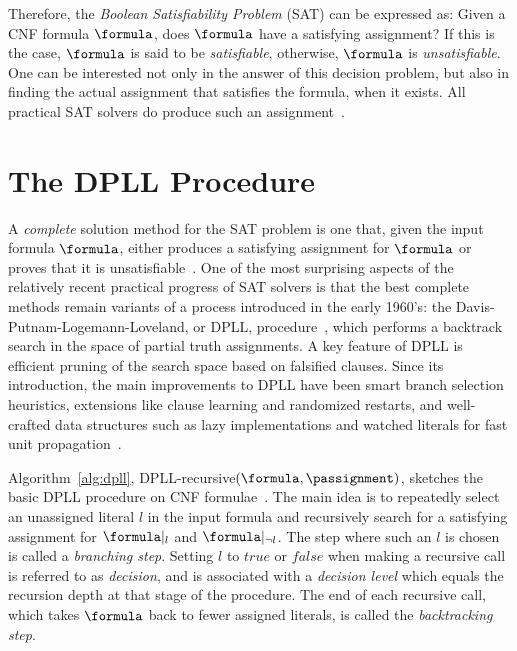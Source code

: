 Therefore, the \emph{Boolean Satisfiability Problem} (SAT) can be expressed as:
Given a CNF formula $\formula$, does $\formula$ have a satisfying assignment? If
this is the case, $\formula$ is said to be \emph{satisfiable}, otherwise,
$\formula$ is \emph{unsatisfiable}.  One can be interested not only in the
answer of this decision problem, but also in finding the actual assignment that
satisfies the formula, when it exists. All practical SAT solvers do produce such
an assignment~\cite{cormen}. 

\section{The DPLL Procedure}%
\label{sec:dpll}

A \emph{complete} solution method for the SAT problem is one that, given the
input formula $\formula$, either produces a satisfying assignment for $\formula$
or proves that it is unsatisfiable~\cite{satchapter}. One of the most surprising
aspects of the relatively recent practical progress of SAT solvers is that the
best complete methods remain variants of a process introduced in the early
1960’s: the Davis-Putnam-Logemann-Loveland, or DPLL,
procedure~\cite{DavisLongemannLoveland:1962}, which performs a backtrack search
in the space of partial truth assignments. A key feature of DPLL is efficient
pruning of the search space based on falsified clauses. Since its introduction,
the main improvements to DPLL have been smart branch selection heuristics,
extensions like clause learning and randomized restarts, and well-crafted data
structures such as lazy implementations and watched literals for fast unit
propagation~\cite{satchapter}.

Algorithm~\ref{alg:dpll}, DPLL-recursive$(\formula, \passignment)$, sketches the basic
DPLL procedure on CNF formulae~\cite{DavisLongemannLoveland:1962}. The main idea
is to repeatedly select an unassigned literal $l$ in the input formula and
recursively search for a satisfying assignment for $\formula|_l$ and
$\formula|_{\neg l}$. The step where such an $l$ is chosen is called a
\emph{branching step}. Setting $l$ to $true$ or $false$ when making a recursive call
is referred to as \emph{decision}, and is associated with a \emph{decision
level} which equals the recursion depth at that stage of the procedure. The end
of each recursive call, which takes $\formula$ back to fewer assigned literals,
is called the \emph{backtracking step}.

